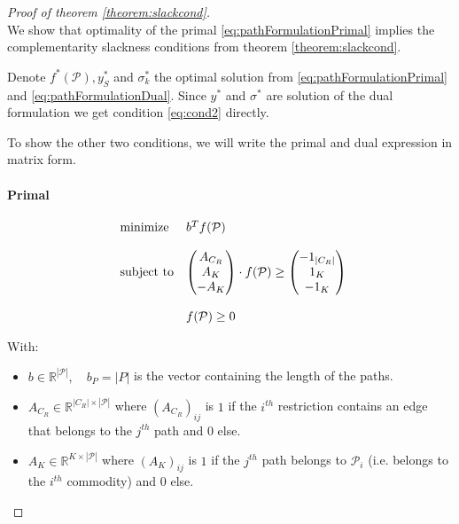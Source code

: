 \documentclass[14pt,a4paper]{article}
\theoremstyle{definition}
\numberwithin{equation}{subsection}
\begin{document}
\begin{proof}[Proof of theorem \ref{theorem:slackcond}]$ $\\
	 We show that optimality of the primal \eqref{eq:pathFormulationPrimal} implies the complementarity slackness conditions from theorem \ref{theorem:slackcond}. 
	 
	 Denote $f^*(\mathcal{P}),y^*_{S}$ and $\sigma^*_k$ the optimal solution from \eqref{eq:pathFormulationPrimal} and \eqref{eq:pathFormulationDual}. Since $y^*$ and $\sigma^*$ are solution of the dual formulation we get condition \eqref{eq:cond2} directly.
	 
	 To show the other two conditions, we will write the primal and dual expression in matrix form.
	 
	 \paragraph{Primal}
	 \begin{equation*}
	 	\begin{array}{ll@{}ll}
	 \text{minimize}  &b^T f(\mathcal{P})  \\
	 \\
	 \text{subject to} 
	 &\left( \begin{matrix} A_{C_R}	\\ A_K \\ -A_K \\ \end{matrix} \right) \cdot f(\mathcal{P}) \geq  \left( \begin{matrix} -1_{|C_R|}	\\ 1_K \\ -1_K \\ \end{matrix} \right) \\
	 \\
	                                          &f(\mathcal{P}) \geq 0
	 \end{array}
	 \label{eq:matrixformprimal}
	 \end{equation*}
	 
	 With: 
	 \begin{itemize}
	 	\item $b \in \mathbb{R}^{|\mathcal{P}|}, \quad b_P = |P|$ is the vector containing the length of the paths.
	 	\item $A_{C_R} \in \mathbb{R}^{|C_R|\times |\mathcal{P}|}$ where $\left(A_{C_R}\right)_{ij}$ is $1$ if the $i^{th}$ restriction contains an edge that belongs to the $j^{th}$ path and $0$ else.
	 	\item $A_K \in \mathbb{R}^{K\times |\mathcal{P}|}$ where $\left(A_K\right)_{ij}$ is $1$ if the $j^{th}$ path belongs to $\mathcal{P}_i$ (i.e. belongs to the $i^{th}$ commodity) and $0$ else.
	 \end{itemize}
 

\end{proof}
\end{document}
